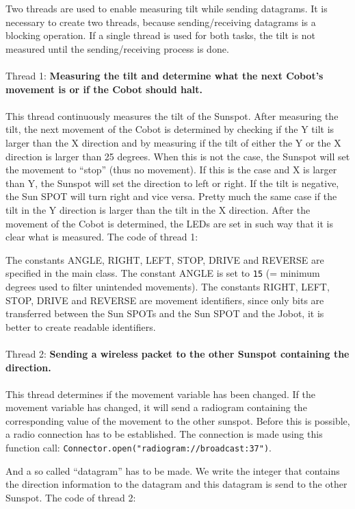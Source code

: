 \documentclass[a4paper,10pt]{article} %
\begin{document}
Two threads are used to enable measuring tilt while sending datagrams. It is
necessary to create two threads, because sending/receiving datagrams is a
blocking operation. If a single thread is used for both tasks, the tilt is not
measured until the sending/receiving process is done.
\\
\\
\noindent Thread 1: \textbf{Measuring the tilt and determine what the next Cobot's
movement is or if the Cobot should halt.}
\\
\\
This thread continuously measures the tilt of the Sunspot. After measuring the
tilt, the next movement of the Cobot is determined by checking if the Y tilt is
larger than the X direction and by measuring if the tilt of either the Y or the
X direction is larger than 25 degrees. When this is not the case, the Sunspot
will set the movement to ``stop'' (thus no movement). If this is the case and X
is larger than Y, the Sunspot will set the direction to left or right. If the
tilt is negative, the Sun SPOT will turn right and vice versa.  Pretty much the
same case if the tilt in the Y direction is larger than the tilt in the X
direction. After the movement of the Cobot is determined, the LEDs are set in
such way that it is clear what is measured. The code of thread 1:



\noindent The constants ANGLE, RIGHT, LEFT, STOP, DRIVE and REVERSE are
specified in the main class. The constant ANGLE is set to \texttt{15} (= minimum
degrees used to filter unintended movements). The constants RIGHT, LEFT, STOP,
DRIVE and REVERSE are movement identifiers, since only bits are transferred
between the Sun SPOTs and the Sun SPOT and the Jobot, it is better to create
readable identifiers.
\\
\\
\noindent Thread 2: \textbf{Sending a wireless packet to the other Sunspot
containing the direction.}
\\
\\
This thread determines if the movement variable has been changed. If the
movement variable has changed, it will send a radiogram containing the
corresponding value of the movement to the other sunspot. Before this is
possible, a radio connection has to be established. The connection is made using
this function call: \texttt{Connector.open("radiogram://broadcast:37")}.

And a so called ``datagram'' has to be made. We write the integer that contains
the direction information to the datagram and this datagram is send to the other
Sunspot. The code of thread 2:
\end{document}
